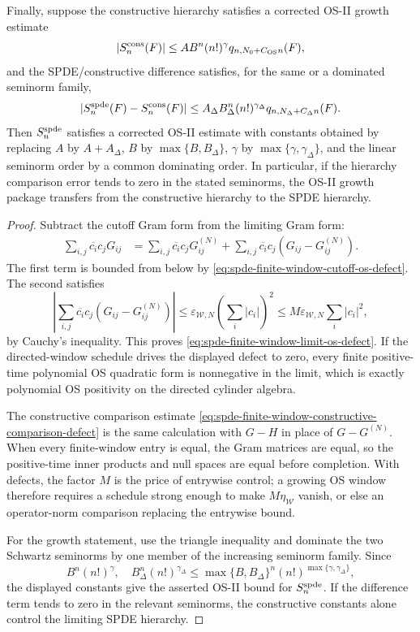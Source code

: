 \begin{proposition}
Finally, suppose the constructive hierarchy satisfies a corrected OS-II
growth estimate
\[
  |S_n^{\rm cons}(F)|
  \leq
  A B^n(n!)^\gamma q_{n,N_0+C_{\rm OS}n}(F),
\]
and the SPDE/constructive difference satisfies, for the same or a dominated
seminorm family,
\[
  |S_n^{\rm spde}(F)-S_n^{\rm cons}(F)|
  \leq
  A_\Delta B_\Delta^n(n!)^{\gamma_\Delta}
  q_{n,N_\Delta+C_\Delta n}(F).
\]
Then \(S_n^{\rm spde}\) satisfies a corrected OS-II estimate with constants
obtained by replacing \(A\) by \(A+A_\Delta\), \(B\) by
\(\max\{B,B_\Delta\}\), \(\gamma\) by
\(\max\{\gamma,\gamma_\Delta\}\), and the linear seminorm order by a common
dominating order.  In particular, if the hierarchy comparison error tends to
zero in the stated seminorms, the OS-II growth package transfers from the
constructive hierarchy to the SPDE hierarchy.
\end{proposition}

\begin{proof}
Subtract the cutoff Gram form from the limiting Gram form:
\[
\begin{aligned}
  \sum_{i,j}\overline{c_i}c_jG_{ij}
  &=
  \sum_{i,j}\overline{c_i}c_jG_{ij}^{(N)}
  +
  \sum_{i,j}\overline{c_i}c_j(G_{ij}-G_{ij}^{(N)}).
\end{aligned}
\]
The first term is bounded from below by
\eqref{eq:spde-finite-window-cutoff-os-defect}.  The second satisfies
\[
  \left|
  \sum_{i,j}\overline{c_i}c_j(G_{ij}-G_{ij}^{(N)})
  \right|
  \leq
  \varepsilon_{\mathcal W,N}
  \left(\sum_i |c_i|\right)^2
  \leq
  M\varepsilon_{\mathcal W,N}\sum_i |c_i|^2,
\]
by Cauchy's inequality.  This proves
\eqref{eq:spde-finite-window-limit-os-defect}.  If the directed-window
schedule drives the displayed defect to zero, every finite positive-time
polynomial OS quadratic form is nonnegative in the limit, which is exactly
polynomial OS positivity on the directed cylinder algebra.

The constructive comparison estimate
\eqref{eq:spde-finite-window-constructive-comparison-defect} is the same
calculation with \(G-H\) in place of \(G-G^{(N)}\).  When every finite-window
entry is equal, the Gram matrices are equal, so the positive-time inner
products and null spaces are equal before completion.  With defects, the
factor \(M\) is the price of entrywise control; a growing OS window therefore
requires a schedule strong enough to make \(M\eta_{\mathcal W}\) vanish, or
else an operator-norm comparison replacing the entrywise bound.

For the growth statement, use the triangle inequality and dominate the two
Schwartz seminorms by one member of the increasing seminorm family.  Since
\[
  B^n(n!)^\gamma,\quad
  B_\Delta^n(n!)^{\gamma_\Delta}
  \leq
  \max\{B,B_\Delta\}^n
  (n!)^{\max\{\gamma,\gamma_\Delta\}},
\]
the displayed constants give the asserted OS-II bound for
\(S_n^{\rm spde}\).  If the difference term tends to zero in the relevant
seminorms, the constructive constants alone control the limiting SPDE
hierarchy.
\end{proof}

